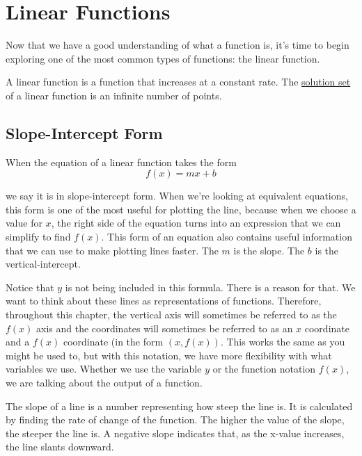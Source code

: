 \chapter{Linear Functions}

Now that we have a good understanding of what a function is, it's time to begin exploring one of the most common types of functions: the linear function.


\begin{defn}\label{Line}
	A linear function is a function that increases at a constant rate. The \hyperref[Solution Set]{solution set} of a linear function is an infinite number of points. 
\end{defn}


\section{Slope-Intercept Form}

When the equation of a linear function takes the form
\begin{equation}
f(x) = mx + b
\end{equation}

\noindent
we say it is in slope-intercept form.  When we're looking at equivalent equations, this form is one of the most useful for plotting the line, because when we choose a value for $x$, the right side of the equation turns into an expression that we can simplify to find $f(x)$.  This form of an equation also contains useful information that we can use to make plotting lines faster.  The $m$ is the slope.  The $b$ is the vertical-intercept. 

Notice that $y$ is not being included in this formula. There is a reason for that. We want to think about these lines as representations of functions. Therefore, throughout this chapter, the vertical axis will sometimes be referred to as the $f(x)$ axis and the coordinates will sometimes be referred to as an $x$ coordinate and a $f(x)$ coordinate (in the form $(x, f(x))$. This works the same as you might be used to, but with this notation, we have more flexibility with what variables we use. Whether we use the variable $y$ or the function notation $f(x)$, we are talking about the output of a function. 

	
\begin{defn}[Slope]
	The slope of a line is a number representing how steep the line is. It is calculated by finding the rate of change of the function. The higher the value of the slope, the steeper the line is. A negative slope indicates that, as the x-value increases, the line slants downward.
\end{defn}

